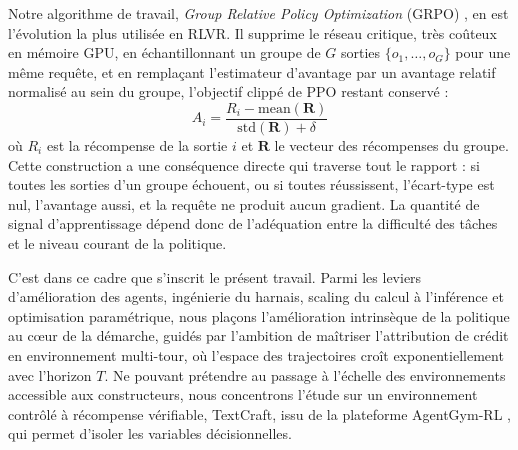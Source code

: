 \documentclass[11pt,a4paper]{article}
\begin{document}
Notre algorithme de travail, \emph{Group Relative Policy Optimization} (GRPO) \cite{shao2024deepseekmath}, en est l'évolution la plus utilisée en RLVR. Il supprime le réseau critique, très coûteux en mémoire GPU, en échantillonnant un groupe de $G$ sorties $\{o_1, \dots, o_G\}$ pour une même requête, et en remplaçant l'estimateur d'avantage par un avantage relatif normalisé au sein du groupe, l'objectif clippé de PPO restant conservé :
\begin{equation}
\hat{A}_i = \frac{R_i - \text{mean}(\mathbf{R})}{\text{std}(\mathbf{R}) + \delta}
\end{equation}
où $R_i$ est la récompense de la sortie $i$ et $\mathbf{R}$ le vecteur des récompenses du groupe. Cette construction a une conséquence directe qui traverse tout le rapport : si toutes les sorties d'un groupe échouent, ou si toutes réussissent, l'écart-type est nul, l'avantage aussi, et la requête ne produit aucun gradient. La quantité de signal d'apprentissage dépend donc de l'adéquation entre la difficulté des tâches et le niveau courant de la politique.

C'est dans ce cadre que s'inscrit le présent travail. Parmi les leviers d'amélioration des agents, ingénierie du harnais, scaling du calcul à l'inférence et optimisation paramétrique, nous plaçons l'amélioration intrinsèque de la politique au cœur de la démarche, guidés par l'ambition de maîtriser l'attribution de crédit en environnement multi-tour, où l'espace des trajectoires croît exponentiellement avec l'horizon $T$. Ne pouvant prétendre au passage à l'échelle des environnements accessible aux constructeurs, nous concentrons l'étude sur un environnement contrôlé à récompense vérifiable, TextCraft, issu de la plateforme AgentGym-RL \cite{xi_agentgym-rl_2025}, qui permet d'isoler les variables décisionnelles.
\end{document}
